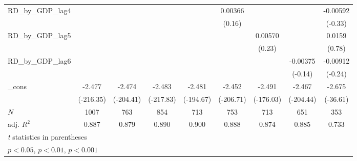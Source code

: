 {\begin{tabular}{l*{8}{c}}
\addlinespace
RD\_by\_GDP\_lag4&                     &                     &                     &                     &     0.00366         &                     &                     &    -0.00592         \\
            &                     &                     &                     &                     &      (0.16)         &                     &                     &     (-0.33)         \\
\addlinespace
RD\_by\_GDP\_lag5&                     &                     &                     &                     &                     &     0.00570         &                     &      0.0159         \\
            &                     &                     &                     &                     &                     &      (0.23)         &                     &      (0.78)         \\
\addlinespace
RD\_by\_GDP\_lag6&                     &                     &                     &                     &                     &                     &    -0.00375         &    -0.00912         \\
            &                     &                     &                     &                     &                     &                     &     (-0.14)         &     (-0.24)         \\
\addlinespace
\_cons      &      -2.477\sym{***}&      -2.474\sym{***}&      -2.483\sym{***}&      -2.481\sym{***}&      -2.452\sym{***}&      -2.491\sym{***}&      -2.467\sym{***}&      -2.675\sym{***}\\
            &   (-216.35)         &   (-204.41)         &   (-217.83)         &   (-194.67)         &   (-206.71)         &   (-176.03)         &   (-204.44)         &    (-36.61)         \\
\midrule
\(N\)       &        1007         &         763         &         854         &         713         &         753         &         713         &         651         &         353         \\
adj. \(R^{2}\)&       0.887         &       0.879         &       0.890         &       0.900         &       0.888         &       0.874         &       0.885         &       0.733         \\
\bottomrule
\multicolumn{9}{l}{\footnotesize \textit{t} statistics in parentheses}\\
\multicolumn{9}{l}{\footnotesize \sym{*} \(p<0.05\), \sym{**} \(p<0.01\), \sym{***} \(p<0.001\)}\\
\end{tabular}
}
